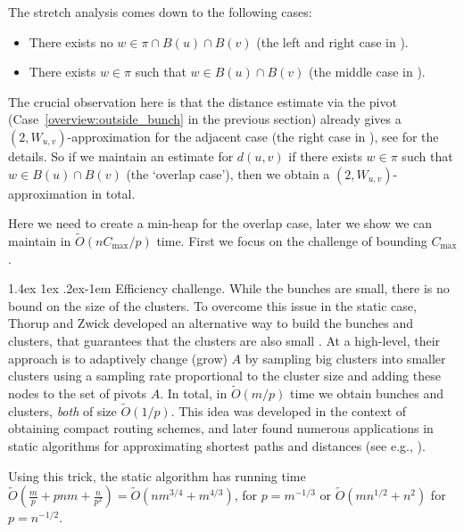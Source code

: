 \documentclass[11pt]{article}
\makeatletter
\theoremstyle{definition}
\theoremstyle{remark}
\renewcommand{\paragraph}{%
  \@startsection{paragraph}{4}%
  {\z@}{1.4ex \@plus 1ex \@minus .2ex}{-1em}%
  {\normalfont\normalsize\bfseries}%
}
\makeatother
\begin{document}
\begin{titlepage}
The stretch analysis comes down to the following cases:
\begin{itemize}%
    \item There exists no $w\in \pi\cap B(u)\cap B(v)$ (the left and right case in ). 
    \item There exists $w\in \pi$ such that $w\in B(u)\cap B(v)$ (the middle case in ). \label{overview:overlap}
\end{itemize}

The crucial observation here is that the distance estimate via the pivot (Case~\ref{overview:outside_bunch} in the previous section) already gives a $(2, W_{u,v})$-approximation for the adjacent case (the right case in ), see  for the details. So if we maintain an estimate for $d(u,v)$ if there exists $w\in \pi$ such that $w\in B(u)\cap B(v)$ (the `overlap case'), then we obtain a $(2, W_{u,v})$-approximation in total. 


Here we need to create a min-heap for the overlap case, later we show we can maintain in $\tilde O(nC_{\max}/p)$ time. First we focus on the challenge of bounding $C_{\max}$.

\paragraph{Efficiency challenge.}
While the bunches are small, there is no bound on the size of the clusters. To overcome this issue in the static case, Thorup and Zwick developed an alternative way to build the bunches and clusters, that guarantees that the clusters are also small \cite{TZ01}. At a high-level, their approach is to adaptively change (grow) $A$ by sampling big clusters into smaller clusters using a sampling rate proportional to the cluster size and adding these nodes to the set of pivots $A$. In total, in $\tilde O(m/p)$ time we obtain bunches and clusters, \emph{both} of size $\tilde O(1/p)$.
This idea was developed in the context of obtaining compact routing schemes, and later found numerous applications in static algorithms for approximating shortest paths and distances (see e.g., \cite{BaswanaK10,AkavR20,backurs2021toward,AkavR21}).

Using this trick, the static algorithm has running time $\tilde {O}(\tfrac{m}{p}+pnm+\tfrac{n}{p^2})=\tilde O(nm^{3/4}+m^{4/3})$, for $p=m^{-1/3}$ or $\tilde O(mn^{1/2}+n^2)$ for $p=n^{-1/2}$. 



\end{titlepage}
\end{document}
